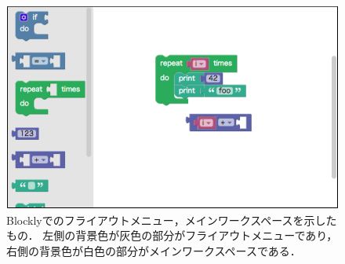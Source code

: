 \begin{figure}[h]
 \centering
 \includegraphics[keepaspectratio, scale=0.3]{img/blocklyWorkspace.png}
 \caption{Blocklyでのフライアウトメニュー，メインワークスペースを示したもの．
 左側の背景色が灰色の部分がフライアウトメニューであり，
 右側の背景色が白色の部分がメインワークスペースである．\label{fig:workspace}}
\end{figure}
